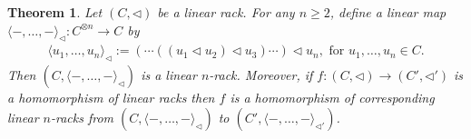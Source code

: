 \documentclass[a4paper,reqno,10pt]{amsart}
\theoremstyle{plain}
\newtheorem{thm}{Theorem}[section]
\theoremstyle{definition}
\theoremstyle{remark}
\begin{document}
\begin{thm}\label{thm-lrack-lnrack}
    Let $(C, \triangleleft)$ be a linear rack. For any $n \geq 2$, 
    define a linear map $\langle -, \ldots, - \rangle_\triangleleft : C^{\otimes n} \rightarrow C$ by
    \begin{align}\label{some-n}
        \langle u_1, \ldots, u_n \rangle_\triangleleft := ( \cdots  ((u_1 \triangleleft u_2) \triangleleft u_3) \cdots) \triangleleft u_n, \text{ for } u_1, \ldots, u_n \in C.
    \end{align}
    Then $(C, \langle -, \ldots, - \rangle_\triangleleft)$ is a linear $n$-rack.
    Moreover, if $f : (C, \triangleleft) \rightarrow (C', \triangleleft')$ is a homomorphism of linear racks then $f$ is a homomorphism of corresponding linear $n$-racks from $(C, \langle -, \ldots, - \rangle_\triangleleft )$ to $(C', \langle -, \ldots, - \rangle_{\triangleleft'} )$.
\end{thm}
\end{document}
